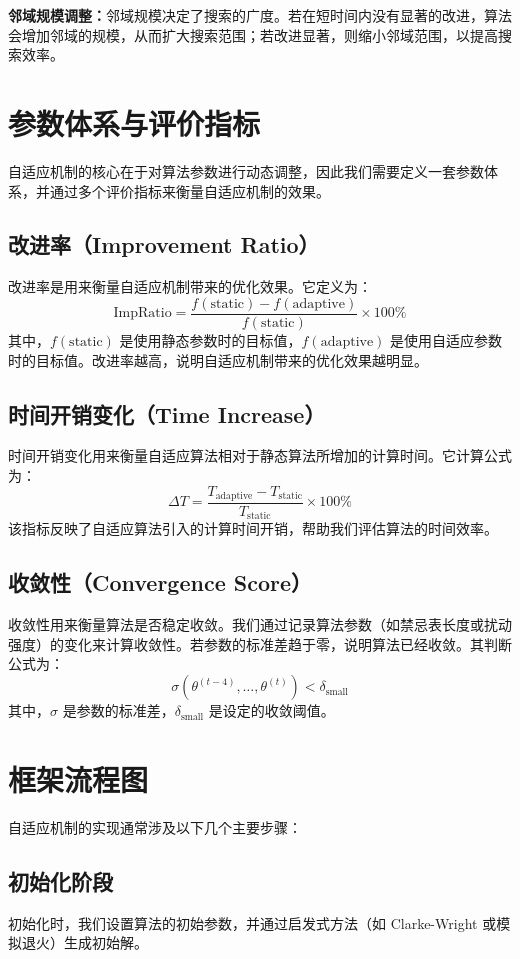 \documentclass[12pt,a4paper,twoside]{ctexbook}
\begin{document}
\textbf{邻域规模调整：}邻域规模决定了搜索的广度。若在短时间内没有显著的改进，算法会增加邻域的规模，从而扩大搜索范围；若改进显著，则缩小邻域范围，以提高搜索效率。

\section{参数体系与评价指标}
自适应机制的核心在于对算法参数进行动态调整，因此我们需要定义一套参数体系，并通过多个评价指标来衡量自适应机制的效果。

\subsection{改进率（Improvement Ratio）}
改进率是用来衡量自适应机制带来的优化效果。它定义为：
\[
\text{ImpRatio} = \frac{f(\text{static}) - f(\text{adaptive})}{f(\text{static})} \times 100\%
\]
其中，$f(\text{static})$ 是使用静态参数时的目标值，$f(\text{adaptive})$ 是使用自适应参数时的目标值。改进率越高，说明自适应机制带来的优化效果越明显。

\subsection{时间开销变化（Time Increase）}
时间开销变化用来衡量自适应算法相对于静态算法所增加的计算时间。它计算公式为：
\[
\Delta T = \frac{T_{\text{adaptive}} - T_{\text{static}}}{T_{\text{static}}} \times 100\%
\]
该指标反映了自适应算法引入的计算时间开销，帮助我们评估算法的时间效率。

\subsection{收敛性（Convergence Score）}
收敛性用来衡量算法是否稳定收敛。我们通过记录算法参数（如禁忌表长度或扰动强度）的变化来计算收敛性。若参数的标准差趋于零，说明算法已经收敛。其判断公式为：
\[
\sigma(\theta^{(t-4)}, \dots, \theta^{(t)}) < \delta_{\text{small}}
\]
其中，$\sigma$ 是参数的标准差，$\delta_{\text{small}}$ 是设定的收敛阈值。

\section{框架流程图}
自适应机制的实现通常涉及以下几个主要步骤：

\subsection{初始化阶段}
初始化时，我们设置算法的初始参数，并通过启发式方法（如 Clarke-Wright 或模拟退火）生成初始解。
\end{document}

